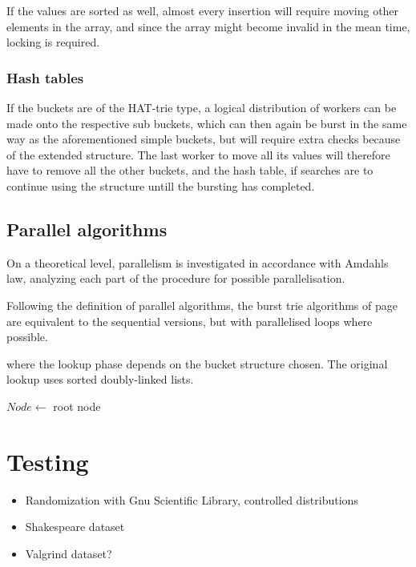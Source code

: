 \documentclass[11pt,a4paper]{article}
\begin{document}
If the values are sorted as well, almost every insertion will require moving
other elements in the array, and since the array might become invalid in the
mean time, locking is required.

\subsubsection{Hash tables}
If the buckets are of the HAT-trie type, a logical distribution of workers
can be made onto the respective sub buckets, which can then again be burst in
the same way as the aforementioned simple buckets, but will require extra checks
because of the extended structure. The last worker to move all its values will
therefore have to remove all the other buckets, and the hash table, if searches
are to continue using the structure untill the bursting has completed.

\subsection{Parallel algorithms}
On a theoretical level, parallelism is investigated in accordance with Amdahls
law, analyzing each part of the procedure for possible parallelisation.

Following the definition of parallel algorithms, the burst trie algorithms of
page \pageref{alg:bt_insert} are equivalent to the sequential versions, but
with parallelised loops where possible.


where the lookup phase depends on the bucket structure chosen. The original
lookup uses sorted doubly-linked lists. 

\begin{algorithm}[H]
    \caption{$k$\FuncSty{)}}

    $Node \leftarrow$  root node\;
\end{algorithm}

\section{Testing}
\begin{itemize}
    \item Randomization with Gnu Scientific Library, controlled distributions
    \item Shakespeare dataset
    \item Valgrind dataset?
\end{itemize}
\end{document}
